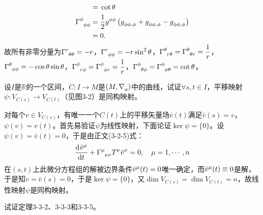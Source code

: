 \begin{xiti}
\begin{jie}
\begin{align*}
		=&\; \cot\theta\\
		\ChristoffelSymbol{\phi}{\phi}{\phi}=&\; \christoffelSymbol{\phi}{\phi}{\phi}{\phi}\\
		=&\; 0.
		\end{align*}
		故所有非零分量为$\displaystyle \ChristoffelSymbol{r}{\theta}{\theta}=-r $，$\displaystyle \ChristoffelSymbol{r}{\phi}{\phi}=-r \sin^2 \theta $，$\displaystyle \ChristoffelSymbol{\theta}{r}{\theta} = \ChristoffelSymbol{\theta}{\theta}{r} = \frac{1}{r} $，$\displaystyle \ChristoffelSymbol{\theta}{\phi}{\phi} = - \cos \theta \sin \theta $，$\displaystyle \ChristoffelSymbol{\phi}{r}{\phi} = \ChristoffelSymbol{\phi}{\phi}{r} = \frac{1}{r} $，$\displaystyle \ChristoffelSymbol{\phi}{\theta}{\phi} = \ChristoffelSymbol{\phi}{\phi}{\theta}=\cot\theta $。
	\end{jie}

	\item 设$I$是$\mathbb{R}$的一个区间，$C\colon I\rightarrow M $是$\left( M,\Nabla{a} \right)$中的曲线，试证$\forall s,t\in I $，平移映射$\psi\colon V_{C(s)}\rightarrow V_{C(t)} $（见图3-2）是同构映射。
	
	\begin{zm}
		对每个$v\in V_{C(s)}$，有唯一一个$C(t)$上的平移矢量场$\bar{v}(t)$满足$\bar{v}(s)=v$，$\psi(v)=v(t)$。首先易验证$\psi$为线性映射，下面论证$\ker\psi=\{0\}$。设$\psi(v)= \bar{v}(t)=0$，于是由正文(3-2-5)式：
		\begin{displaymath}
		\dvt{\tensor{\bar{v}}{^\mu}} + \ChristoffelSymbol{\mu}{\nu}{\sigma} \tensor{T}{^\nu}\tensor{\bar{v}}{^\sigma}=0 \qc \mu=1,\cdots ,n
		\end{displaymath}
		在$(s,t)$上此微分方程组的解被边界条件$\tensor{\bar{v}}{^\mu}(t)=0 $唯一确定，而$\tensor{\bar{v}}{^\mu}(t)\equiv0 $是解，于是知$v=\bar{v}(s)=0$，于是$\ker \psi=\{0\}$，又$\dim V_{C(s)}=\dim V_{C(t)}=n $，故线性映射$\psi $是同构映射。
	\end{zm}

	\item 试证定理3-3-2、3-3-3和3-3-5。
	

\end{xiti}
